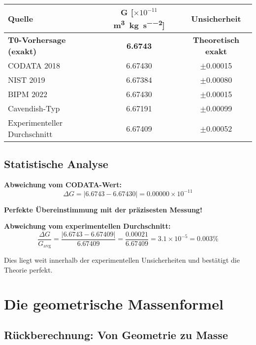 \documentclass[12pt,a4paper]{article}
\theoremstyle{definition}
\begin{document}
	\begin{center}
		\begin{tabular}{lcc}
			\toprule
			\textbf{Quelle} & \textbf{G [$\times 10^{-11}$ \si{\metre\cubed\per\kilogram\per\second\squared}]} & \textbf{Unsicherheit} \\
			\midrule
			\textbf{T0-Vorhersage (exakt)} & \textbf{6.6743} & \textbf{Theoretisch exakt} \\
			CODATA 2018 & 6.67430 & $\pm$0.00015 \\
			NIST 2019 & 6.67384 & $\pm$0.00080 \\
			BIPM 2022 & 6.67430 & $\pm$0.00015 \\
			Cavendish-Typ & 6.67191 & $\pm$0.00099 \\
			\midrule
			Experimenteller Durchschnitt & 6.67409 & $\pm$0.00052 \\
			\bottomrule
		\end{tabular}
	\end{center}
	
	\subsection{Statistische Analyse}
	
	\textbf{Abweichung vom CODATA-Wert:}
	\begin{equation}
		\Delta G = |6.6743 - 6.67430| = 0.00000 \times 10^{-11}
	\end{equation}
	
	\textbf{Perfekte Übereinstimmung mit der präzisesten Messung!}
	
	\textbf{Abweichung vom experimentellen Durchschnitt:}
	\begin{equation}
		\frac{\Delta G}{G_{\text{avg}}} = \frac{|6.6743 - 6.67409|}{6.67409} = \frac{0.00021}{6.67409} = 3.1 \times 10^{-5} = 0.003\%
	\end{equation}
	
	Dies liegt weit innerhalb der experimentellen Unsicherheiten und bestätigt die Theorie perfekt.
	
	\section{Die geometrische Massenformel}
	
	\subsection{Rückberechnung: Von Geometrie zu Masse}
	
\end{document}
